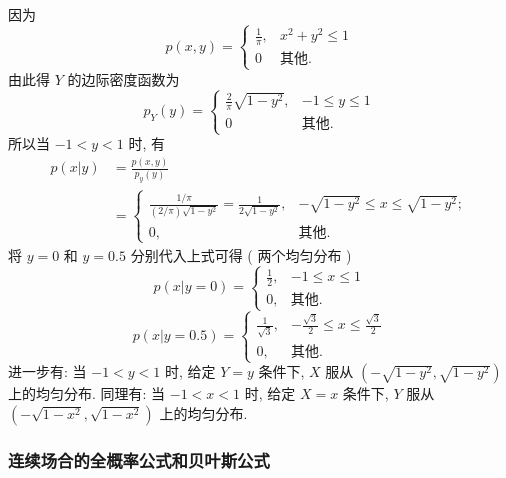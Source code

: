 	\begin{solution}
		因为
		\[
			p(x, y)=\left\{\begin{array}{ll}{\frac{1}{\pi},} & {x^{2}+y^{2} \leqslant 1} \\{0} & \text{其他}.\end{array}\right.
		\]
		由此得 $Y$ 的边际密度函数为
		\[
			p_{Y}(y)=\begin{cases}{\frac{2}{\pi} \sqrt{1-y^{2}}}, &-1\leq y\leq 1 \\{0} & \text{其他}.\end{cases}
		\]
		所以当 $-1<y<1$ 时, 有
		\begin{align*}
			p(x | y) &=\frac{p(x, y)}{p_{y}(y)} \\
			&=\begin{cases}
				\frac{1 / \pi}{(2 / \pi) \sqrt{1-y^{2}}}=\frac{1}{2 \sqrt{1-y^{2}}},& -\sqrt{1-y^{2}} \leq x \leq \sqrt{1-y^{2}};\\
				0,	&	\text{其他}.
			\end{cases} 
		\end{align*}
		将 $y=0$ 和 $y=0.5$ 分别代入上式可得 ( 两个均匀分布 )
		\[
			p(x | y=0)=
			\begin{cases}
			{\frac{1}{2},} & {-1 \leq x \leq 1}	\\
			0,& \text{其他}.
			\end{cases}
		\]
		\[
			p(x | y=0.5)=\begin{cases}
				{\frac{1}{\sqrt{3}}}, &  -\frac{\sqrt{3}}{2} \leq x \leq \frac{\sqrt{3}}{2}\\
				{0},& \text{其他}. \end{cases}
		\]
		进一步有: 当 $-1<y<1$ 时, 给定 $Y=y$ 条件下, $X$ 服从 $\left(-\sqrt{1-y^{2}}, \sqrt{1-y^{2}}\right)$ 上的均匀分布. 同理有: 
		当 $-1<x<1$ 时, 给定 $X=x$ 条件下, $Y$ 服从 $\left(-\sqrt{1-x^{2}}, \sqrt{1-x^{2}}\right)$ 上的均匀分布.
	\end{solution}

	\subsubsection{连续场合的全概率公式和贝叶斯公式}

